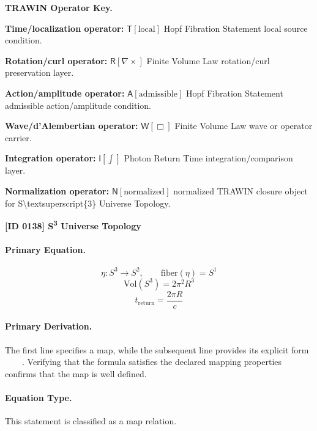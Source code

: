 \par\vspace{0.45\baselineskip}
\noindent\begin{minipage}[t]{\linewidth}
\begingroup
\small
\raggedright
\textbf{TRAWIN Operator Key.}\par
\noindent\textbf{Time/localization operator:} $\mathsf{T}\!\left[\mathrm{local}\right]$ Hopf Fibration Statement local source condition.\par
\noindent\textbf{Rotation/curl operator:} $\mathsf{R}\!\left[\nabla\times\right]$ Finite Volume Law rotation/curl preservation layer.\par
\noindent\textbf{Action/amplitude operator:} $\mathsf{A}\!\left[\mathrm{admissible}\right]$ Hopf Fibration Statement admissible action/amplitude condition.\par
\noindent\textbf{Wave/d'Alembertian operator:} $\mathsf{W}\!\left[\Box\right]$ Finite Volume Law wave or operator carrier.\par
\noindent\textbf{Integration operator:} $\mathsf{I}\!\left[\int\right]$ Photon Return Time integration/comparison layer.\par
\noindent\textbf{Normalization operator:} $\mathsf{N}\!\left[\mathrm{normalized}\right]$ normalized TRAWIN closure object for S\textbackslash{}textsuperscript\{3\} Universe Topology.\par
\endgroup
\end{minipage}

\clearpage
\noindent\textbf{[ID 0138] S\textsuperscript{3} Universe Topology}\par
\vspace{0.35em}
\paragraph{Primary Equation.}
\[
\eta:S^3\to S^2,
\qquad
\mathrm{fiber}(\eta)=S^1
\]
\[
\mathrm{Vol}(S^3)=2\pi^2 R^3
\]
\[
t_{\mathrm{return}}=\frac{2\pi R}{c}
\]

\paragraph{Primary Derivation.}
The first line specifies a map, while the subsequent line provides its explicit form \( \qquad \). Verifying that the formula satisfies the declared mapping properties confirms that the map is well defined.
\paragraph{Equation Type.}
This statement is classified as a map relation.

